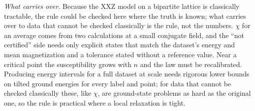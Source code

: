 \documentclass[aps,prx,twocolumn,10pt,superscriptaddress,nofootinbib,longbibliography,floatfix]{revtex4-2}
\theoremstyle{remark}
\begin{document}
\emph{What carries over.} Because the XXZ model on a bipartite lattice is classically tractable, the rule could be
checked here where the truth is known; what carries over to data that cannot be checked classically is the rule, not
the numbers. $\chi$ for an average comes from two calculations at a small conjugate field, and the ``not certified''
side needs only explicit states that match the dataset's energy and mean magnetization and a tolerance stated
without a reference value. Near a critical point the susceptibility grows with $n$ and the law must
be recalibrated. Producing energy intervals for a full dataset at scale needs rigorous lower bounds on tilted ground
energies for every label and point; for data that cannot be checked classically these, like $\chi$, are
ground-state problems as hard as the original one, so the rule is practical where a local relaxation is tight.
\end{document}
